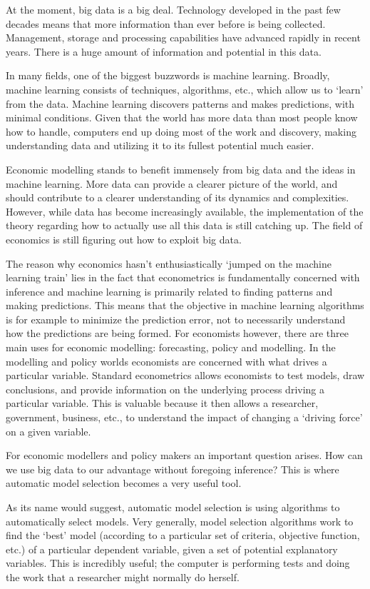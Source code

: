 At the moment, big data is a big deal. Technology developed in the past few decades means that more information than ever before is being collected. Management, storage and processing capabilities have advanced rapidly in recent years. There is a huge amount of information and potential in this data. 

In many fields, one of the biggest buzzwords is machine learning. Broadly, machine learning consists of techniques, algorithms, etc., which allow us to `learn' from the data. Machine learning discovers patterns and makes predictions, with minimal conditions. Given that the world has more data than most people know how to handle, computers end up doing most of the work and discovery, making understanding data and utilizing it to its fullest potential much easier.

Economic modelling stands to benefit immensely from big data and the ideas in machine learning. More data can provide a clearer picture of the world, and should contribute to a clearer understanding of its dynamics and complexities. However, while data has become increasingly available, the implementation of the theory regarding how to actually use all this data is still catching up. The field of economics is still figuring out how to exploit big data. 

The reason why economics hasn't enthusiastically `jumped on the machine learning train' lies in the fact that econometrics is fundamentally concerned with inference and machine learning is primarily related to finding patterns and making predictions. This means that the objective in machine learning algorithms is for example to minimize the prediction error, not to necessarily understand how the predictions are being formed. For economists however, there are three main uses for economic modelling: forecasting, policy and modelling. In the modelling and policy worlds economists are concerned with what drives a particular variable. Standard econometrics allows economists to test models, draw conclusions, and provide information on the underlying process driving a particular variable. This is valuable because it then allows a researcher, government, business, etc., to understand the impact of changing a `driving force' on a given variable. 

For economic modellers and policy makers an important question arises. How can we use big data to our advantage without foregoing inference? This is where automatic model selection becomes a very useful tool.

As its name would suggest, automatic model selection is using algorithms to automatically select models. Very generally, model selection algorithms work to find the `best' model (according to a particular set of criteria, objective function, etc.) of a particular dependent variable, given a set of potential explanatory variables. This is incredibly useful; the computer is performing tests and doing the work that a researcher might normally do herself. 


